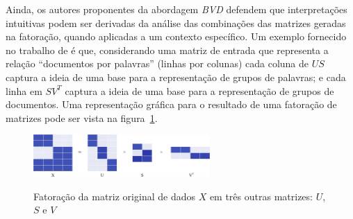 \documentclass[
    12pt,                %
    oneside,            %
    a4paper,            %
    english,            %
    brazil                %
    ]{abntex2ppgsi}
\begin{document}
Ainda, os autores proponentes da abordagem \textit{BVD} defendem que interpretações intuitivas podem ser derivadas da análise das combinações das matrizes geradas na fatoração, quando aplicadas a um contexto específico.
Um exemplo fornecido no trabalho de  é que, considerando uma matriz de entrada que representa a relação ``documentos por palavras'' (linhas por colunas) cada coluna de $US$ captura a ideia de uma base para a representação de grupos de palavras; e cada linha em $SV^T$ captura a ideia de uma base para a representação de grupos de documentos.
Uma representação gráfica para o resultado de uma fatoração de matrizes pode ser vista na figura~\ref{fig:bvd}.


\begin{figure}[H]
\centering
\caption{
Fatoração da matriz original de dados $X$ em três outras matrizes: $U$, $S$ e $V$}
\includegraphics[width=0.6\textwidth]{img/factorizationXUSV.png}
\label{fig:bvd}
\end{figure}
\end{document}
